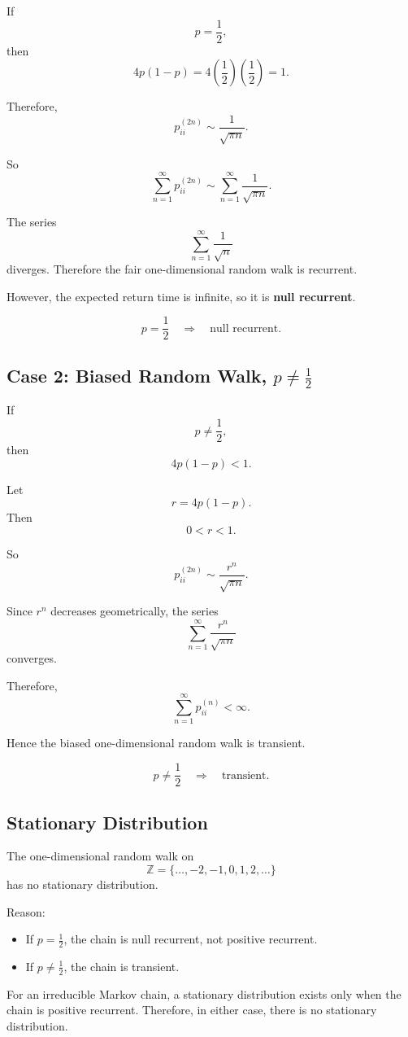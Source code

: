 \documentclass[12pt,a4paper]{article}
\theoremstyle{lecturestyle}
\begin{document}
If
\[
p=\frac12,
\]
then
\[
4p(1-p)=4\left(\frac12\right)\left(\frac12\right)=1.
\]

Therefore,
\[
p_{ii}^{(2n)}
\sim
\frac{1}{\sqrt{\pi n}}.
\]

So
\[
\sum_{n=1}^{\infty}p_{ii}^{(2n)}
\sim
\sum_{n=1}^{\infty}\frac{1}{\sqrt{\pi n}}.
\]

The series
\[
\sum_{n=1}^{\infty}\frac1{\sqrt{n}}
\]
diverges. Therefore the fair one-dimensional random walk is recurrent.

However, the expected return time is infinite, so it is \textbf{null recurrent}.

\[
\boxed{p=\frac12 \quad\Longrightarrow\quad \text{null recurrent}.}
\]

\subsection{Case 2: Biased Random Walk, $p\neq \frac12$}

If
\[
p\neq \frac12,
\]
then
\[
4p(1-p)<1.
\]

Let
\[
r=4p(1-p).
\]
Then
\[
0<r<1.
\]

So
\[
p_{ii}^{(2n)}
\sim
\frac{r^n}{\sqrt{\pi n}}.
\]

Since $r^n$ decreases geometrically, the series
\[
\sum_{n=1}^{\infty}\frac{r^n}{\sqrt{\pi n}}
\]
converges.

Therefore,
\[
\sum_{n=1}^{\infty}p_{ii}^{(n)}<\infty.
\]

Hence the biased one-dimensional random walk is transient.

\[
\boxed{p\neq\frac12 \quad\Longrightarrow\quad \text{transient}.}
\]

\subsection{Stationary Distribution}

The one-dimensional random walk on
\[
\mathbb{Z}=\{\ldots,-2,-1,0,1,2,\ldots\}
\]
has no stationary distribution.

Reason:
\begin{itemize}[leftmargin=1.2cm]
    \item If $p=\frac12$, the chain is null recurrent, not positive recurrent.
    \item If $p\neq\frac12$, the chain is transient.
\end{itemize}

For an irreducible Markov chain, a stationary distribution exists only when the chain is positive recurrent. Therefore, in either case, there is no stationary distribution.
\end{document}
